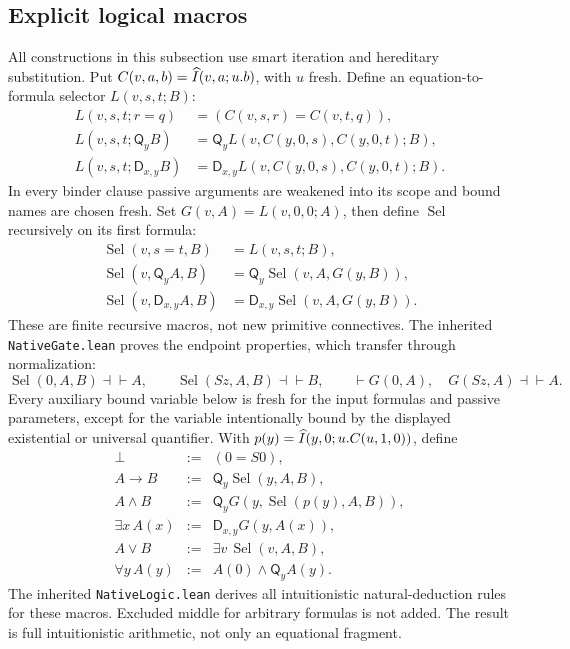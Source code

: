 \documentclass[11pt]{article}
\newcommand{\Q}{\mathsf Q}\newcommand{\D}{\mathsf D}
\newcommand{\Eqv}{\dashv\vdash}
\newcommand{\code}[1]{\nolinkurl{#1}}
\begin{document}
\subsection{Explicit logical macros}
All constructions in this subsection use smart iteration and
hereditary substitution. Put \(C(v,a,b)=\widehat I(v,a;u.b)\), with \(u\)
fresh. Define an equation-to-formula selector \(L(v,s,t;B)\):
\begin{align*}
 L(v,s,t;r=q)&=(C(v,s,r)=C(v,t,q)),\\
 L(v,s,t;\Q_yB)&=\Q_yL(v,C(y,0,s),C(y,0,t);B),\\
 L(v,s,t;\D_{x,y}B)&=\D_{x,y}L(v,C(y,0,s),C(y,0,t);B).
\end{align*}
In every binder clause passive arguments are weakened into its scope
and bound names are chosen fresh.
Set \(G(v,A)=L(v,0,0;A)\), then define \(\operatorname{Sel}\)
recursively on its first formula:
\begin{align*}
 \operatorname{Sel}(v,s=t,B)&=L(v,s,t;B),\\
 \operatorname{Sel}(v,\Q_yA,B)&=
       \Q_y\operatorname{Sel}(v,A,G(y,B)),\\
 \operatorname{Sel}(v,\D_{x,y}A,B)&=
       \D_{x,y}\operatorname{Sel}(v,A,G(y,B)).
\end{align*}
These are finite recursive macros, not new primitive connectives.
The inherited \code{NativeGate.lean} proves the endpoint properties,
which transfer through normalization:
\[
 \operatorname{Sel}(0,A,B)\Eqv A,\qquad
 \operatorname{Sel}(Sz,A,B)\Eqv B,\qquad
 \vdash G(0,A),\quad G(Sz,A)\Eqv A .
\]
Every auxiliary bound variable below is fresh for the input formulas
and passive parameters, except for the variable intentionally bound by
the displayed existential or universal quantifier.
With \(p(y)=\widehat I(y,0;u.C(u,1,0))\), define
\[
\begin{array}{rcl}
 \bot&:=&(0=S0),\\
 A\to B&:=&\Q_y\operatorname{Sel}(y,A,B),\\
 A\wedge B&:=&\Q_yG(y,\operatorname{Sel}(p(y),A,B)),\\
 \exists x\,A(x)&:=&\D_{x,y}G(y,A(x)),\\
 A\vee B&:=&\exists v\,\operatorname{Sel}(v,A,B),\\
 \forall y\,A(y)&:=&A(0)\wedge\Q_y A(y).
\end{array}
\]
The inherited \code{NativeLogic.lean} derives all intuitionistic
natural-deduction rules for these macros.
Excluded middle for arbitrary formulas is not added.
The result is full intuitionistic arithmetic, not only an equational
fragment.
\end{document}

